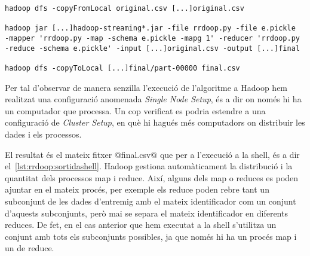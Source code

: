 \begin{lstlisting}[style=sh,caption=Execució a Hadoop de
  rrdoop.py,label=lst:rrdoop:hadoop]
hadoop dfs -copyFromLocal original.csv [...]original.csv

hadoop jar [...]hadoop-streaming*.jar -file rrdoop.py -file e.pickle  -mapper 'rrdoop.py -map -schema e.pickle -mapg 1' -reducer 'rrdoop.py -reduce -schema e.pickle' -input [...]original.csv -output [...]final

hadoop dfs -copyToLocal [...]final/part-00000 final.csv
\end{lstlisting}

Per tal d'observar de manera senzilla l'execució de l'algoritme a
Hadoop hem realitzat una configuració anomenada \emph{Single Node
  Setup}, és a dir on només hi ha un computador que processa.  Un cop
verificat es podria estendre a una configuració de \emph{Cluster
  Setup}, en què hi hagués més computadors on distribuir les dades i
els processos.


El resultat és el mateix fitxer @final.csv@ que per a l'execució a la
shell, és a dir el~\autoref{lst:rrdoop:sortidashell}.  Hadoop gestiona
automàticament la distribució i la quantitat dels processos map i
reduce. Així, alguns dels map o reduces es poden ajuntar en el mateix
procés, per exemple els reduce poden rebre tant un subconjunt de les
dades d'entremig amb el mateix identificador com un conjunt d'aquests
subconjunts, però mai se separa el mateix identificador en diferents
reduces. De fet, en el cas anterior que hem executat a la shell
s'utilitza un conjunt amb tots els subconjunts possibles, ja que només
hi ha un procés map i un de reduce.














